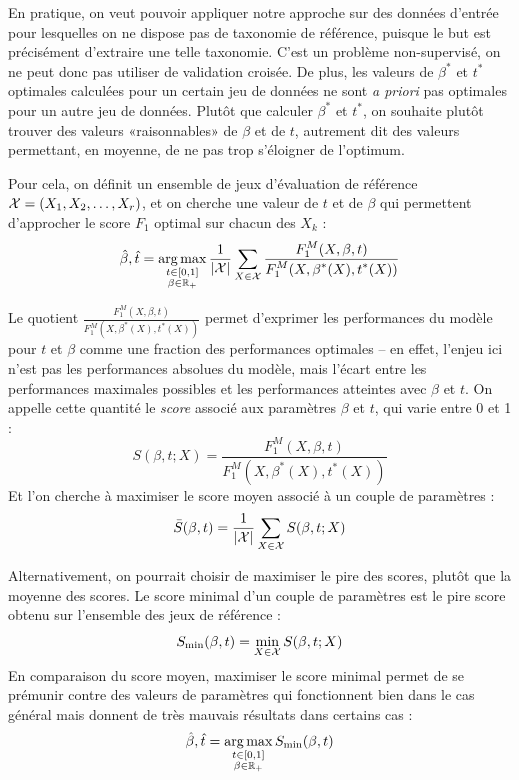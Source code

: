 En pratique, on veut pouvoir appliquer notre approche sur des données d'entrée pour lesquelles on ne dispose pas de taxonomie de référence, puisque le but est précisément d'extraire une telle taxonomie. C'est un problème non-supervisé, on ne peut donc pas utiliser de validation croisée.
De plus, les valeurs de $\beta^*$ et $t^*$ optimales calculées pour un certain jeu de données ne sont \textit{a priori} pas optimales pour un autre jeu de données. 
Plutôt que calculer $\beta^*$ et $t^*$, on souhaite plutôt trouver des valeurs «raisonnables» de $\beta$ et de $t$, autrement dit des valeurs permettant, en moyenne, de ne pas trop s'éloigner de l'optimum.

Pour cela, on définit un ensemble de jeux d'évaluation de référence $\cal{X} = (X_1, X_2, \ldots, X_r)$, et on cherche une valeur de $t$ et de $\beta$ qui permettent d'approcher le score $F_1$ optimal sur chacun des $X_k$ :
\begin{equation}
    \hat{\beta}, \hat{t} = \argmax_{\substack{t \in [0, 1] \\ \beta \in \R_+}} \frac{1}{| \cal{X} |} \sum_{X \in \cal{X}} \frac{\displaystyle F_1^M(X, \beta, t)}{\displaystyle F_1^M(X, \beta^*(X), t^*(X))}
\end{equation}

Le quotient $\frac{ F_1^M(X, \beta, t)}{ F_1^M(X, \beta^*(X), t^*(X))}$ permet d'exprimer les performances du modèle pour $t$ et $\beta$ comme une fraction des performances optimales – en effet, l'enjeu ici n'est pas les performances absolues du modèle, mais l'écart entre les performances maximales possibles et les performances atteintes avec $\beta$ et $t$. On appelle cette quantité le \textit{score} associé aux paramètres $\beta$ et $t$, qui varie entre 0 et 1 :
\begin{equation}
    S(\beta, t; X) = \frac{\displaystyle F_1^M(X, \beta, t)}{\displaystyle F_1^M(X, \beta^*(X), t^*(X))}
\end{equation}
%
Et l'on cherche à maximiser le score moyen associé à un couple de paramètres :
\begin{equation}
    \bar{S}(\beta, t) = \frac{1}{| \cal{X} |} \sum_{X \in \cal{X}} S(\beta, t; X)
\end{equation}


Alternativement, on pourrait choisir de maximiser le pire des scores, plutôt que la moyenne des scores. Le score minimal d'un couple de paramètres est le pire score obtenu sur l'ensemble des jeux de référence :
\begin{equation}
    S_{\min}(\beta, t) = \min_{X \in \cal{X}} S(\beta, t; X)
\end{equation}
En comparaison du score moyen, maximiser le score minimal permet de se prémunir contre des valeurs de paramètres qui fonctionnent bien dans le cas général mais donnent de très mauvais résultats dans certains cas :
\begin{equation}
    \hat{\beta}, \hat{t} = \argmax_{\substack{t \in [0, 1] \\ \beta \in \R_+}}
    S_{\min}(\beta, t)
\end{equation}


